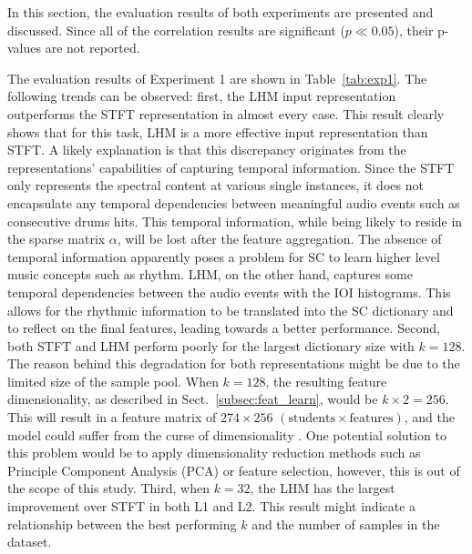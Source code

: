 \documentclass{ws-ijsc}
\begin{document}
In this section, the evaluation results of both experiments are presented and discussed. Since all of the correlation results are significant ($p\ll 0.05$), their p-values are not reported.  

The evaluation results of Experiment 1 are shown in Table~\ref{tab:exp1}. The following trends can be observed: first, the LHM input representation outperforms the STFT representation in almost every case. This result clearly shows that for this task, LHM is a more effective input representation than STFT. A likely explanation is that this discrepancy originates from the representations' capabilities of capturing temporal information. Since the STFT only represents the spectral content at various single instances, it does not encapsulate any temporal dependencies between meaningful audio events such as consecutive drums hits. This temporal information, while being likely to reside in the sparse matrix $\alpha$, will be lost after the feature aggregation. The absence of temporal information apparently poses a problem for SC to learn higher level music concepts such as rhythm. LHM, on the other hand, captures some temporal dependencies between the audio events with the IOI histograms. This allows for the rhythmic information to be translated into the SC dictionary and to reflect on the final features, leading towards a better performance. 
Second, both STFT and LHM perform poorly for the largest dictionary size with $k = 128$. The reason behind this degradation for both representations might be due to the limited size of the sample pool. When $k = 128$, the resulting feature dimensionality, as described in Sect.~\ref{subsec:feat_learn}, would be $k \times 2 = 256$. This will result in a feature matrix of $274 \times 256$ $(\text{students} \times \text{features})$, and the model could suffer from the curse of dimensionality \cite{Bishop2006}. One potential solution to this problem would be to apply dimensionality reduction methods such as Principle Component Analysis (PCA) or feature selection, however, this is out of the scope of this study. 
Third, when $k = 32$, the LHM has the largest improvement over STFT in both L1 and L2. This result might indicate a relationship between the best performing $k$ and the number of samples in the dataset.
\end{document}
